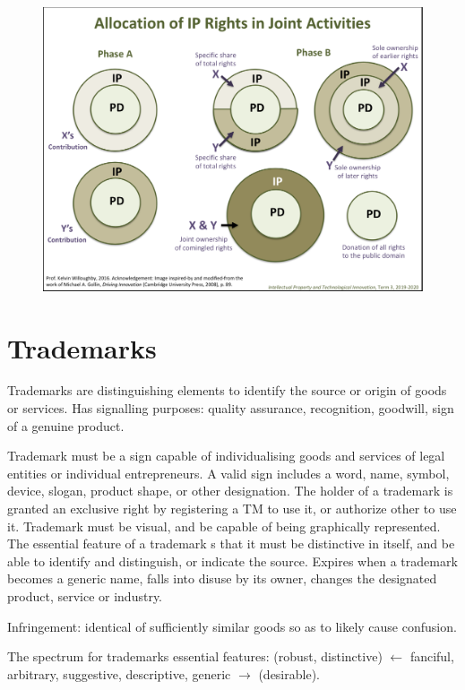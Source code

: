 \documentclass[10pt,a4paper,twocolumn]{article}
\begin{document}
\begin{figure}
  \centering
  \includegraphics[width=\columnwidth]{ip_allocation.png}
\end{figure}


\section{Trademarks} %
\label{sec:trademarks}

Trademarks are distinguishing elements to identify the source or origin of goods or services.
Has signalling purposes: quality assurance, recognition, goodwill, sign of a genuine product.

Trademark must be a sign capable of individualising goods and services of legal entities
or individual entrepreneurs. A valid sign includes a word, name, symbol, device, slogan,
product shape, or other designation. The holder of a trademark is granted an exclusive right
by registering a TM to use it, or authorize other to use it. Trademark must be visual, and
be capable of being graphically represented. The essential feature of a trademark s that
it must be distinctive in itself, and be able to identify and distinguish, or indicate the
source. Expires when a trademark becomes a generic name, falls into disuse by its owner,
changes the designated product, service or industry.

Infringement: identical of sufficiently similar goods so as to likely cause confusion.

The spectrum for trademarks essential features:
(robust, distinctive) $\leftarrow$ fanciful, arbitrary, suggestive, descriptive,
generic $\rightarrow$ (desirable).
\end{document}
